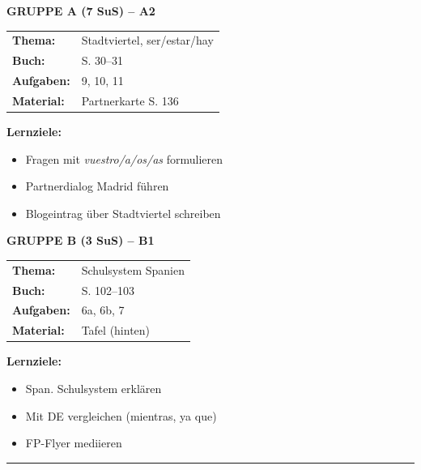\documentclass[11pt, a4paper]{article}
\begin{document}
\begin{minipage}[t]{0.48\textwidth}
\textbf{\textcolor{gruppeA}{GRUPPE A (7 SuS) -- A2}}\\[0.2cm]
\begin{tabular}{@{}ll@{}}
\textbf{Thema:} & Stadtviertel, ser/estar/hay \\
\textbf{Buch:} & S. 30--31 \\
\textbf{Aufgaben:} & 9, 10, 11 \\
\textbf{Material:} & Partnerkarte S. 136 \\
\end{tabular}

\vspace{0.3cm}

\textbf{Lernziele:}
\begin{itemize}
\item Fragen mit \textit{vuestro/a/os/as} formulieren
\item Partnerdialog Madrid führen
\item Blogeintrag über Stadtviertel schreiben
\end{itemize}
\end{minipage}
\hfill
\begin{minipage}[t]{0.48\textwidth}
\textbf{\textcolor{gruppeB}{GRUPPE B (3 SuS) -- B1}}\\[0.2cm]
\begin{tabular}{@{}ll@{}}
\textbf{Thema:} & Schulsystem Spanien \\
\textbf{Buch:} & S. 102--103 \\
\textbf{Aufgaben:} & 6a, 6b, 7 \\
\textbf{Material:} & Tafel (hinten) \\
\end{tabular}

\vspace{0.3cm}

\textbf{Lernziele:}
\begin{itemize}
\item Span. Schulsystem erklären
\item Mit DE vergleichen (mientras, ya que)
\item FP-Flyer mediieren
\end{itemize}
\end{minipage}

\vspace{0.3cm}
\hrule
\vspace{0.3cm}

\end{document}
